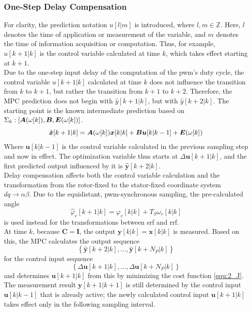 \subsubsection{One-Step Delay Compensation}
For clarity, the prediction notation $u[l|m]$ is introduced, where $l, m \in \mathbb{Z}$. Here, $l$ denotes the time of application or measurement of the variable, and $m$ denotes the time of information acquisition or computation. Thus, for example, $u[k+1|k]$ is the control variable calculated at time $k$, which takes effect starting at $k+1$.\\
Due to the one-step input delay of the computation of the \acrshort{pwm}'s duty cycle, the control variable $u[k+1|k]$ calculated at time $k$ does not influence the transition from $k$ to $k+1$, but rather the transition from $k+1$ to $k+2$. Therefore, the MPC prediction does not begin with $\hat{y}[k+1|k]$, but with $\hat{y}[k+2|k]$. The starting point is the known intermediate prediction based on $\Sigma_k: \left[\bm{A}(\omega[k]),\bm{B},\bm{E}(\omega[k])\right]$.
\begin{equation}
	\hat{\bm{x}}[k+1|k] = \bm{A}(\omega[k]) \bm{x}[k|k] + \bm{B}\bm{u}[k|k-1] + \bm{E}(\omega[k])
	\label{equ:delComp_sys_model}
\end{equation}
Where $\boldsymbol{u}[k|k-1]$ is the control variable calculated in the previous sampling step and now in effect. The optimization variable thus starts at $\Delta \boldsymbol{u}[k+1|k]$, and the first predicted output influenced by it is $\hat{\boldsymbol{y}}[k+2|k].$\\
Delay compensation affects both the control variable calculation and the transformation from the rotor-fixed to the stator-fixed coordinate system $dq \rightarrow \alpha\beta$. Due to the equidistant, \acrshort{pwm}-synchronous sampling, the pre-calculated angle
\[
\hat{\varphi}_e[k+1|k] = \varphi_e[k|k] + T_S \omega_e[k|k]
\]
is used instead for the transformations between \acrshort{srf} and \acrshort{rrf}.\\
At time $k$, because $\boldsymbol{C}=\boldsymbol{I}$, the output $ \boldsymbol{y}[k|k]=\boldsymbol{x}[k|k] $ is measured. Based on this, the MPC calculates the output sequence
\[
\left\{\hat{\boldsymbol{y}}[k+2|k],\dots,\hat{\boldsymbol{y}}[k+N_P|k]\right\}
\]
for the control input sequence
\[
\left\{\Delta \boldsymbol{u}[k+1|k],\dots,\Delta \boldsymbol{u}[k+N_P|k]\right\}
\]
and determines $\boldsymbol{u}[k+1|k]$ from this by minimizing the cost function \eqref{equ:2_J}. The measurement result $\boldsymbol{y}[k+1|k+1]$ is still determined by the control input $\boldsymbol{u}[k|k-1]$ that is already active; the newly calculated control input $\boldsymbol{u}[k+1|k]$ takes effect only in the following sampling interval.

